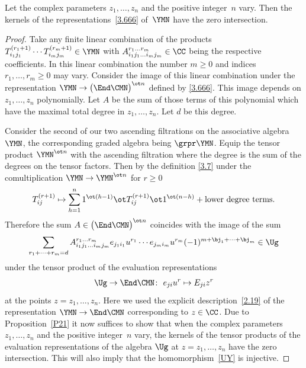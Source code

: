 \begin{Proposition}\label{P22}
Let the complex parameters $z_1,\dots, z_n$ and the positive integer~$n$ vary.
Then the kernels of the representations~\eqref{3.666} of~$\YMN$
have the zero intersection.
\end{Proposition}

\begin{proof}Take any finite linear combination of the products
$T_{i_1j_1}^{(r_1+1)}\cdots T_{i_mj_m}^{(r_m+1)}\in\YMN$ with
$
A_{i_1j_1\dots i_mj_m}^{r_1\dots r_m}\in\CC
$
being the respective coefficients.
In this linear combination the number $m\ge0$ and
indices $r_1,\dots, r_m\ge0$ may vary.
Consider the image of this linear combination
under the representation
$\YMN\to\big(\End\CMN\big)^{\ot n}$ defined by \eqref{3.666}.
This image depends on $z_1,\dots, z_n$ polynomially.
Let $A$ be the sum of those terms of
this polynomial which have the maximal total degree in $z_1,\dots, z_n $.
Let $d$ be this degree.

Consider the second of our two ascending filtrations
on the associative algebra $\YMN $,
the corresponding graded algebra being $\grpr\YMN $.
Equip the tensor product $\YMN^{\ot n}$ with the ascending
filtration where the degree is the sum of the degrees on the tensor factors.
Then by the definition \eqref{3.7}
under the comultiplication $\YMN\to\YMN^{\ot n}$ for $r\ge0$
\begin{gather*}
T_{ij}^{(r+1)}\mapsto
\sum_{h=1}^n
1^{\ot (h-1)}\ot T_{ij}^{(r+1)}\ot1^{\ot (n-h)}
 +
\text{lower degree terms.}
\end{gather*}
Therefore the sum $A\in\big(\End\CMN\big)^{\ot n}$
coincides with the image of the sum
\begin{gather*}
\sum_{r_1+\dots+r_m= d}
A_{i_1j_1\dots i_mj_m}^{r_1\dots r_m}
e_{j_1i_1} u^{r_1}\cdots e_{j_mi_m} u^{r_m}
(-1)^{m + \bj_1 + \dots + \bj_m}\in\Ug
\end{gather*}
under the tensor product of the evaluation representations
\begin{gather}\label{evalrep}
\Ug\to\End\CMN\colon \
e_{ji} u^{r}
\mapsto
E_{ji} z^{r}
\end{gather}
at the points $z=z_1,\dots, z_n $. Here we used the explicit
description~\eqref{2.19}
of the representation $\YMN\to\End\CMN$ corresponding to $z\in\CC $.
Due to Proposition~\ref{P21} it now
suffices to show that when the complex parameters $z_1,\dots, z_n$
and the positive integer~$n$ vary, the kernels
of the tensor products
of the evaluation representations
of the algebra $\Ug$ at $z=z_1,\dots, z_n$
have the zero intersection.
This will also imply that the homomorphism~\eqref{UY} is injective.


\end{proof}
